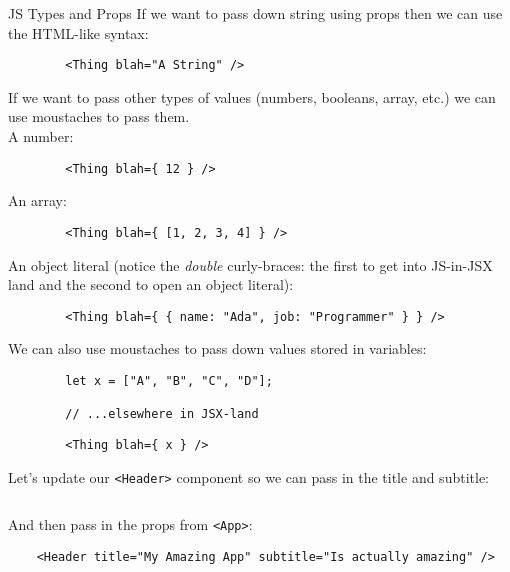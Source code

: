\begin{infobox}{JS Types and Props}
    If we want to pass down string using props then we can use the HTML-like syntax:

    \begin{verbatim}
        <Thing blah="A String" />
    \end{verbatim}

    If we want to pass other types of values (numbers, booleans, array, etc.) we can use moustaches to pass them.
    \\

    A number:

    \begin{verbatim}
        <Thing blah={ 12 } />
    \end{verbatim}

    An array:

    \begin{verbatim}
        <Thing blah={ [1, 2, 3, 4] } />
    \end{verbatim}

    An object literal (notice the \textit{double} curly-braces: the first to get into JS-in-JSX land and the second to open an object literal):

    \begin{verbatim}
        <Thing blah={ { name: "Ada", job: "Programmer" } } />
    \end{verbatim}

    We can also use moustaches to pass down values stored in variables:

    \begin{verbatim}
        let x = ["A", "B", "C", "D"];

        // ...elsewhere in JSX-land
    \end{verbatim}
    \begin{verbatim}
        <Thing blah={ x } />
    \end{verbatim}
\end{infobox}


\pagebreak


Let's update our \texttt{<Header>} component so we can pass in the title and subtitle:

\inputminted{jsx}{03-props/figures/06-Header.jsx}

And then pass in the props from \texttt{<App>}:

\begin{verbatim}
    <Header title="My Amazing App" subtitle="Is actually amazing" />
\end{verbatim}




